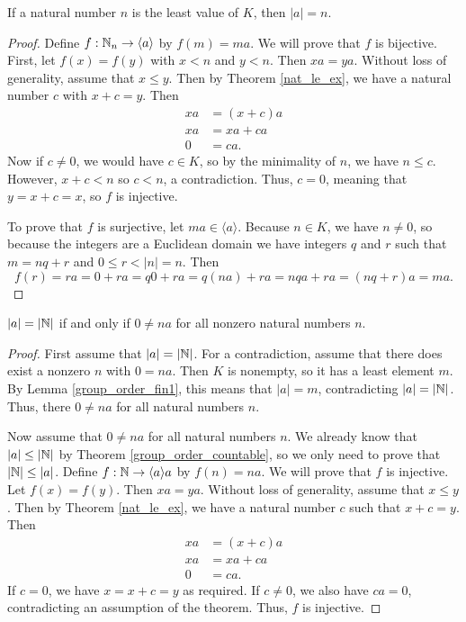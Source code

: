 \documentclass[../../math.tex]{subfiles}
\begin{document}
\begin{lemma} \label{group_order_fin1}
    If a natural number $n$ is the least value of $K$, then $|a| = n$.
\end{lemma}
\begin{proof}
    Define $f : \mathbb{N}_n \to \langle a \rangle$ by $f(m) = ma$.  We will prove that
    $f$ is bijective.  First, let $f(x) = f(y)$ with $x < n$ and $y < n$.  Then
    $xa = ya$.  Without loss of generality, assume that $x \leq y$.  Then by
    Theorem \ref{nat_le_ex}, we have a natural number $c$ with $x + c = y$.
    Then
    \begin{align*}
        xa &= (x + c)a \\
        xa &= xa + ca \\
        0 &= ca.
    \end{align*}
    Now if $c \neq 0$, we would have $c \in K$, so by the minimality of $n$, we
    have $n \leq c$.  However, $x + c < n$ so $c < n$, a contradiction.  Thus,
    $c = 0$, meaning that $y = x + c = x$, so $f$ is injective.

    To prove that $f$ is surjective, let $ma \in \langle a \rangle$.  Because $n
    \in K$, we have $n \neq 0$, so because the integers are a Euclidean domain
    we have integers $q$ and $r$ such that $m = nq + r$ and $0 \leq r < |n| =
    n$.  Then
    \[
        f(r) = ra = 0 + ra = q0 + ra = q(na) + ra = nqa + ra = (nq + r)a = ma.
    \]
\end{proof}

\begin{theorem} \label{group_order_inf}
    $|a| = |\mathbb{N}|$ if and only if $0 \neq na$ for all nonzero natural numbers $n$.
\end{theorem}
\begin{proof}
    First assume that $|a| = |\mathbb{N}|$.  For a contradiction, assume that there does
    exist a nonzero $n$ with $0 = na$.  Then $K$ is nonempty, so it has a least
    element $m$.  By Lemma \ref{group_order_fin1}, this means that $|a| = m$,
    contradicting $|a| = |\mathbb{N}|$.  Thus, there $0 \neq na$ for all natural numbers
    $n$.

    Now assume that $0 \neq na$ for all natural numbers $n$.  We already know
    that $|a| \leq |\mathbb{N}|$ by Theorem \ref{group_order_countable}, so we only need
    to prove that $|\mathbb{N}| \leq |a|$.  Define $f : \mathbb{N} \to \langle a \rangle a$ by
    $f(n) = na$.  We will prove that $f$ is injective.  Let $f(x) = f(y)$.  Then
    $xa = ya$.  Without loss of generality, assume that $x \leq y$.  Then by
    Theorem \ref{nat_le_ex}, we have a natural number $c$ such that $x + c = y$.
    Then
    \begin{align*}
        xa &= (x + c)a \\
        xa &= xa + ca \\
        0 &= ca.
    \end{align*}
    If $c = 0$, we have $x = x + c = y$ as required.  If $c \neq 0$, we also
    have $ca = 0$, contradicting an assumption of the theorem.  Thus, $f$ is
    injective.
\end{proof}
\end{document}
